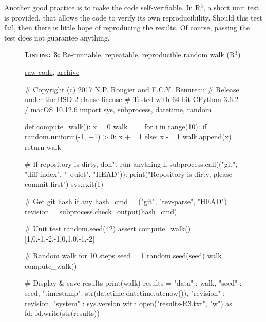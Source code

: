 \documentclass[a4paper,11pt]{article}
\begin{document}
Another good practice is to make the code self-verifiable. In R$^3$, a short unit test is provided, that allows the code to verify its own reproducibility. Should this test fail, then there is little hope of reproducing the results. Of course, passing the test does not guarantee anything.\\

\begin{figure}[t!]
\noindent \begin{minipage}[c]{\linewidth}
\begin{code}{\parbox{.8\textwidth}{\textbf{\textsc{Listing 3:}} Re-runnable, repeatable, reproducible random walk (R$^3$)}\parbox{.161\textwidth}{\hfill \href{https://raw.githubusercontent.com/rougier/random-walk/frontiers/random-walk-R3.py}{raw code}, \href{https://doi.org/10.5281/zenodo.848217}{archive}}}
# Copyright (c) 2017 N.P. Rougier and F.C.Y. Benureau
# Release under the BSD 2-clause license
# Tested with 64-bit CPython 3.6.2 / macOS 10.12.6
import sys, subprocess, datetime, random

def compute_walk():
    x = 0
    walk = []
    for i in range(10):
        if random.uniform(-1, +1) > 0:
            x += 1
        else:
            x -= 1
        walk.append(x)
    return walk

# If repository is dirty, don"t run anything
if subprocess.call(("git", "diff-index",
                    "--quiet", "HEAD")):
    print("Repository is dirty, please commit first")
    sys.exit(1)

# Get git hash if any
hash_cmd = ("git", "rev-parse", "HEAD")
revision = subprocess.check_output(hash_cmd)

# Unit test
random.seed(42)
assert compute_walk() == [1,0,-1,-2,-1,0,1,0,-1,-2]

# Random walk for 10 steps
seed = 1
random.seed(seed)
walk = compute_walk()

# Display & save results
print(walk)
results = {
    "data"     : walk,
    "seed"     : seed,
    "timestamp": str(datetime.datetime.utcnow()),
    "revision" : revision,
    "system"   : sys.version}
with open("results-R3.txt", "w") as fd:
    fd.write(str(results))
\end{code}
\end{minipage}\\
\end{figure}
\end{document}

